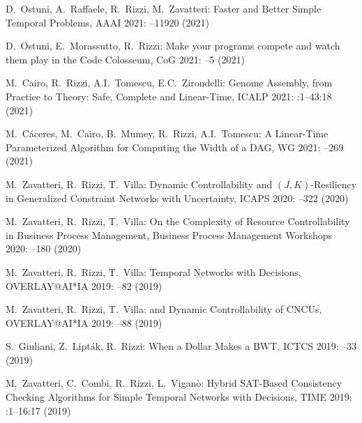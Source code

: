 \begin{etaremune}
\item {\sc D.~Ostuni, A.~Raffaele, R.~Rizzi, M.~Zavatteri:}
   \newblock Faster and Better Simple Temporal Problems,
   \newblock AAAI 2021:
   --11920 (2021)
   
\item {\sc D.~Ostuni, E.~Morassutto, R.~Rizzi:}
   \newblock Make your programs compete and watch them play in the Code Colosseum,
   \newblock CoG 2021:
   --5 (2021)
   
\item {\sc M.~Cairo, R.~Rizzi, A.I.~Tomescu, E.C.~Zirondelli:}
   \newblock Genome Assembly, from Practice to Theory: Safe, Complete and Linear-Time,
   \newblock ICALP 2021:
   :1--43:18 (2021)
   
\item {\sc M.~Cáceres, M.~Cairo, B.~Mumey, R.~Rizzi, A.I.~Tomescu:}
   \newblock A Linear-Time Parameterized Algorithm for Computing the Width of a DAG,
   \newblock WG 2021:
   --269 (2021)
   
\item {\sc M.~Zavatteri, R.~Rizzi, T.~Villa:}
   \newblock Dynamic Controllability and $(J,K)$-Resiliency in Generalized Constraint Networks with Uncertainty,
   \newblock  ICAPS 2020:
   --322 (2020)
   
\item {\sc M.~Zavatteri, R.~Rizzi, T.~Villa:}
   \newblock On the Complexity of Resource Controllability in Business Process Management,
   \newblock  Business Process Management Workshops 2020:
   --180 (2020)
   
\item {\sc M.~Zavatteri, R.~Rizzi, T.~Villa:}
   \newblock Temporal Networks with Decisions,
   \newblock  OVERLAY@AI*IA 2019:
   --82 (2019)
   
\item {\sc M.~Zavatteri, R.~Rizzi, T.~Villa:}
   \newblock  and Dynamic Controllability of CNCUs,
   \newblock  OVERLAY@AI*IA 2019:
   --88 (2019)
   
 \item {\sc S.~Giuliani, Z.~Lipták, R.~Rizzi:}
   \newblock  When a Dollar Makes a BWT,
   \newblock  ICTCS 2019:
   --33 (2019)
  
\item {\sc M.~Zavatteri, C.~Combi, R.~Rizzi, L.~Viganò:}
   \newblock Hybrid SAT-Based Consistency Checking Algorithms for Simple Temporal Networks with Decisions,
   \newblock  TIME 2019:
   :1--16:17 (2019)
  

\end{etaremune}
